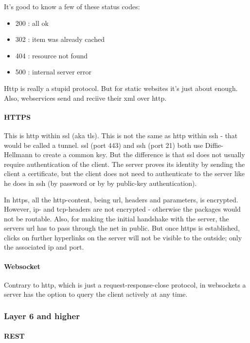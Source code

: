It's good to know a few of these status codes: 
\begin{itemize}
    \item 200 : all ok
    \item 302 : item was already cached
    \item 404 : resource not found
    \item 500 : internal server error
\end{itemize}

Http is really a stupid protocol. But for static websites it's just about enough. Also, webservices send and reciive their xml over http.

\paragraph{HTTPS} 

This is http within ssl (aka tls). This is not the same as http within ssh - that would be called a tunnel. ssl (port 443) and ssh (port 21) both use Diffie-Hellmann to create a common key. But the difference is that ssl does not usually require authentication of the client. The server proves its identity by sending the client a certificate, but the client does not need to authenticate to the server like he does in ssh (by password or by by public-key authentication).

In https, all the http-content, being url, headers and parameters, is encrypted. However, ip- and tcp-headers are not encrypted - otherwise the packages would not be routable. Also, for making the initial handshake with the server, the servers url has to pass through the net in public. But once https is established, clicks on further hyperlinks on the server will not be visible to the outside; only the associated ip and port.

\paragraph{Websocket}
Contrary to http, which is just a request-response-close protocol, in websockets a server has the option to query the client actively at any time. 


\subsubsection{Layer 6 and higher}

\paragraph{REST} 

